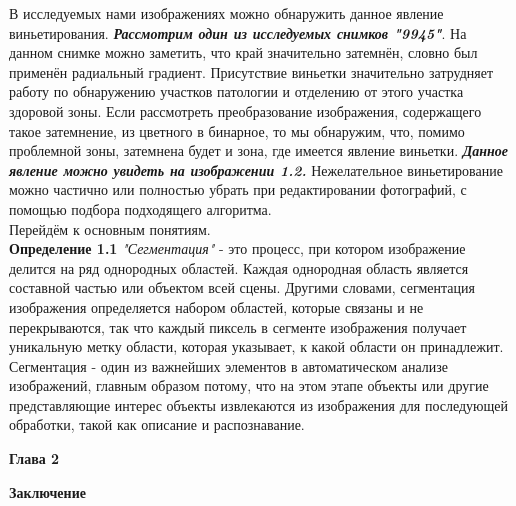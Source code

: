 \documentclass[12pt]{article}
\begin{document}
В исследуемых нами изображениях можно обнаружить данное явление виньетирования. \textbf{\textit{Рассмотрим один из исследуемых снимков "9945"}}. На данном снимке можно заметить, что край значительно затемнён, словно был применён радиальный градиент. Присутствие виньетки значительно затрудняет работу по обнаружению участков патологии и отделению от этого участка здоровой зоны. Если рассмотреть преобразование изображения, содержащего такое затемнение, из цветного в бинарное, то мы обнаружим, что, помимо проблемной зоны, затемнена будет и зона, где имеется явление виньетки. \textbf{\textit{Данное явление можно увидеть на изображении 1.2.}} Нежелательное виньетирование можно частично или полностью убрать при редактировании фотографий, с помощью подбора подходящего алгоритма.\\

Перейдём к основным понятиям.\\
\textbf{Определение 1.1} \textit{"Сегментация"} - это процесс, при котором изображение делится на ряд однородных областей. Каждая однородная область является составной частью или объектом всей сцены. Другими словами, сегментация изображения определяется набором областей, которые связаны и не перекрываются, так что каждый пиксель в сегменте изображения получает уникальную метку области, которая указывает, к какой области он принадлежит. Сегментация - один из важнейших элементов
в автоматическом анализе изображений, главным образом потому, что на этом этапе объекты или другие представляющие интерес объекты извлекаются из изображения для последующей обработки, такой как описание и распознавание. 
\begin{center}
	\textbf{Глава 2}
\end{center}
\begin{center}
	\textbf{Заключение}
\end{center}
\end{document}
